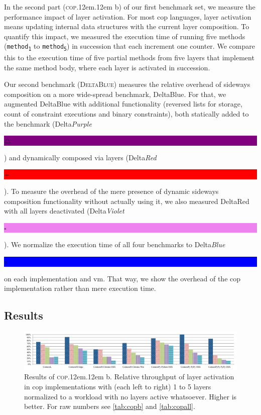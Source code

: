 \documentclass[preprint,english,10pt,nonatbib]{sigplanconf}
\DeclareRobustCommand*\copb{\textsc{cop}\kern .12em\oldstylenums{09}\kern .12em b\xspace}
\DeclareRobustCommand*\deltablue{\textsc{DeltaBlue}\xspace}
\begin{document}
In the second part (\copb) of our first benchmark set, we measure the
performance impact of layer activation. For most \ac{cop} languages, layer
activation means updating internal data structures with the current layer
composition. To quantify this impact, we measured the execution time of running
five methods (\texttt{method\textsubscript{1}} to
\texttt{method\textsubscript{5}}) in succession that each increment one
counter. We compare this to the execution time of five partial methods from
five layers that implement the same method body, where each layer is activated
in succession.


\def\idBox#1#2{%
\setlength{\fboxsep}{1pt}%
\colorbox{#1}{\textcolor[gray]{0.9}{\rule[0.1pt]{0pt}{5pt}#2}}%
\xspace}

Our second benchmark (\deltablue) measures the relative overhead of sideways
composition on a more wide-spread benchmark, DeltaBlue. For that, we augmented
DeltaBlue with additional functionality (reversed lists for storage, count of
constraint executions and binary constraints), both statically added to the
benchmark (Delta\emph{Purple}~\idBox{purple}{\(\bigtriangleup\)})
and dynamically composed via layers (Delta\emph{Red}~\idBox{red}{\(+\)}).
To measure the overhead of the mere presence of dynamic sideways composition
functionality without actually using it, we also measured DeltaRed with all
layers deactivated (Delta\emph{Violet} ~\idBox{violet}{\(\square\)}).
We normalize the execution time of all four benchmarks to
Delta\emph{Blue}~\idBox{blue}{\(\circ\)}
on each implementation and \ac{vm}. That way, we show the overhead of the
\ac{cop} implementation rather than mere execution time.


\subsection{Results}

\begin{figure}
  \centering
  \includegraphics[width=.85\linewidth]{bench/malte-b}
  \caption{Results of \copb. Relative throughput of layer activation in
    \protect\acs{cop} implementations with (each left to right) 1 to 5 layers
    normalized to a workload with no layers active whatsoever. Higher is
    better. For raw numbers see \autoref{tab:copb} and \autoref{tab:copall}.}
  \label{fig:malte-b}
\end{figure}
\end{document}
